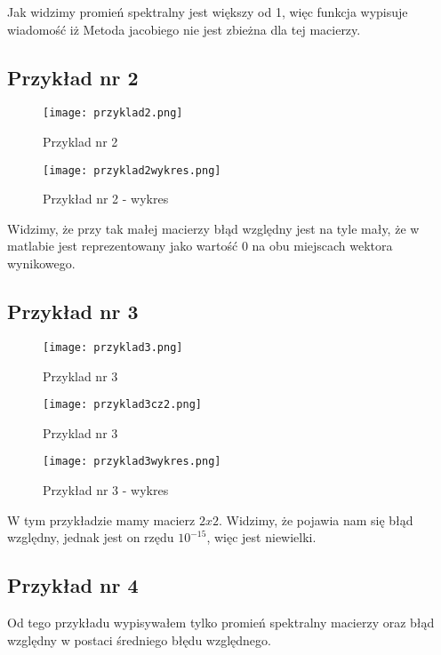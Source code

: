 \documentclass{article}
\begin{document}
Jak widzimy promień spektralny jest większy od 1, więc funkcja wypisuje wiadomość iż Metoda jacobiego nie jest zbieżna dla tej macierzy.

\subsection{Przykład nr 2}

\begin{figure}[H]
  \caption{Przyklad nr 2}
  \centering
  \texttt{[image: przyklad2.png]}
\end{figure}

\begin{figure}[H]
  \caption{Przykład nr 2 - wykres}
  \centering
  \texttt{[image: przyklad2wykres.png]}
\end{figure}

Widzimy, że przy tak małej macierzy błąd względny jest na tyle mały, że w matlabie jest reprezentowany jako wartość 0 na obu miejscach wektora wynikowego.

\subsection{Przykład nr 3}

\begin{figure}[H]
  \caption{Przyklad nr 3}
  \centering
  \texttt{[image: przyklad3.png]}
\end{figure}

\begin{figure}[H]
  \caption{Przyklad nr 3}
  \centering
  \texttt{[image: przyklad3cz2.png]}
\end{figure}

\begin{figure}[H]
  \caption{Przykład nr 3 - wykres}
  \centering
  \texttt{[image: przyklad3wykres.png]}
\end{figure}

W tym przykładzie mamy macierz \(2x2\). Widzimy, że pojawia nam się błąd względny, jednak jest on rzędu \(10^{-15}\), więc jest niewielki. 

\subsection{Przykład nr 4}

Od tego przykładu wypisywałem tylko promień spektralny macierzy oraz błąd względny w postaci średniego błędu względnego.
\end{document}
